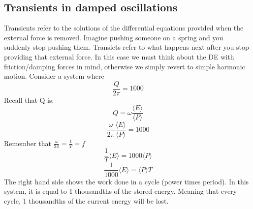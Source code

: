 \documentclass[10pt]{report}
\begin{document}
{{\subsection{Transients in damped oscillations}
\par{Transients refer to the solutions of the differential equations provided when the external force is removed. Imagine pushing someone on a spring and you suddenly stop pushing them. Transiets refer to what happens next after you stop providing that external force. In this case we must think about the DE with friction/damping forces in mind, otherwise we simply revert to simple harmonic motion. Consider a system where \[
\frac{Q}{2\pi}=1000
\] Recall that Q is: \[
Q=\omega\frac{\langle E\rangle}{\langle P\rangle}
\] \[
\frac{\omega}{2\pi}\frac{\langle E\rangle}{\langle P\rangle}=1000
\] Remember that $\frac{\omega}{2\pi}=\frac{1}{T}=f$ \[
\frac{1}{T}\langle E\rangle=1000\langle P\rangle
\] \[
\frac{1}{1000}\langle E\rangle=\langle P\rangle T
\] The right hand side shows the work done in a cycle (power times period). In this system, it is equal to 1 thousandths of the stored energy. Meaning that every cycle, 1 thousandths of the current energy will be lost. }

}}
\end{document}
